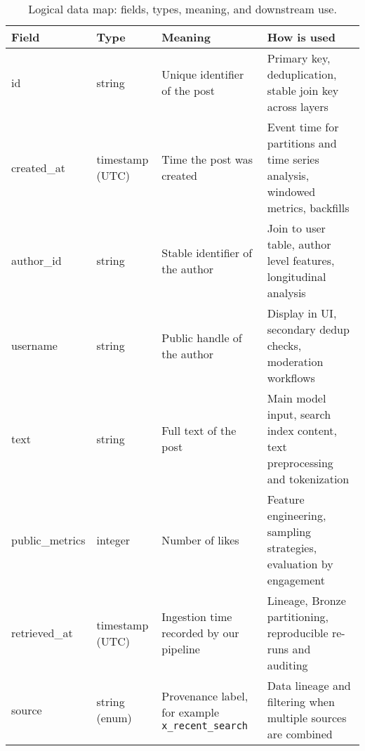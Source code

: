 \begin{table}[htbp]
    \centering
    \begin{tabularx}{\linewidth}{@{}l l X X@{}}
        \toprule
        \textbf{Field}  & \textbf{Type}   & \textbf{Meaning}                                         & \textbf{How is used}                                                            \\
        \midrule
        id              & string          & Unique identifier of the post                            & Primary key, deduplication, stable join key across layers                       \\
        created\_at     & timestamp (UTC) & Time the post was created                                & Event time for partitions and time series analysis, windowed metrics, backfills \\
        author\_id      & string          & Stable identifier of the author                          & Join to user table, author level features, longitudinal analysis                \\
        username        & string          & Public handle of the author                              & Display in UI, secondary dedup checks, moderation workflows                     \\
        text            & string          & Full text of the post                                    & Main model input, search index content, text preprocessing and tokenization     \\
        public\_metrics & integer         & Number of likes                                          & Feature engineering, sampling strategies, evaluation  by engagement             \\

        retrieved\_at   & timestamp (UTC) & Ingestion time recorded by our pipeline                  & Lineage, Bronze partitioning, reproducible re-runs and auditing                 \\
        source          & string (enum)   & Provenance label, for example \texttt{x\_recent\_search} & Data lineage and filtering when multiple sources are combined                   \\
        \bottomrule
    \end{tabularx}
    \caption{Logical data map: fields, types, meaning, and downstream use.}
    \label{tab:logical_data_map}
\end{table}

